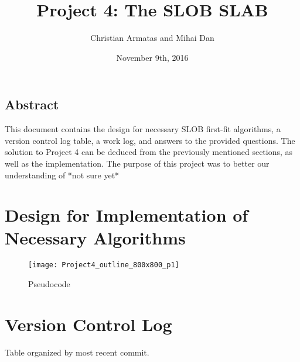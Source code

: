\documentclass[letterpaper,10pt,onecolumn]{IEEEtran}
\title{Project 4: The SLOB SLAB}
\author{Christian Armatas and Mihai Dan}
\date{November 9th, 2016}
\begin{document}
    \begin{center}
        \begin{minipage}[h]{\textwidth}
            \maketitle
        \end{minipage}
    \end{center}
    
    \vspace{140mm}
    
    \begin{center}
        \section*{Abstract}
        This document contains the design for necessary SLOB first-fit algorithms, a version control log table, a work log, and answers to the provided questions. The solution to Project 4 can be deduced from the previously mentioned sections, as well as the implementation. The purpose of this project was to better our understanding of *not sure yet*
    \end{center}
    
    
    \newpage
    
    
    \section*{Design for Implementation of Necessary Algorithms}
    
    \begin{figure}[h]
            \texttt{[image: Project4\_outline\_800x800\_p1]}
            \centering
            \captionsetup{justification=centering}
            \caption{Pseudocode}
        \end{figure}
  

    \vspace{6mm}
    
    
    \section*{Version Control Log}
        \begin{center}
            Table organized by most recent commit.
        \end{center}
        
        \vspace{0.5mm}
        
\end{document}

